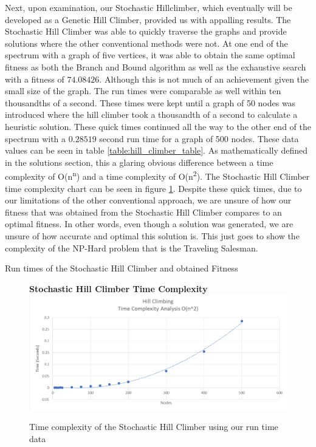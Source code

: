 \documentclass[sigplan,screen]{acmart}
\begin{document}
Next, upon examination, our Stochastic Hillclimber, which eventually will be
developed as a Genetic Hill Climber, provided us with appalling results. The
Stochastic Hill Climber was able to quickly traverse the graphs and provide
solutions where the other conventional methods were not. At one end of the
spectrum with a graph of five vertices, it was able to obtain the same optimal
fitness as both the Branch and Bound algorithm as well as the exhaustive search
with a fitness of $74.08426$. Although this is not much of an achievement given
the small size of the graph. The run times were comparable as well within ten
thousandths of a second. These times were kept until a graph of 50 nodes was
introduced where the hill climber took a thousandth of a second to calculate a
heuristic solution. These quick times continued all the way to the other end of
the spectrum with a $0.28519$ second run time for a graph of 500 nodes. These
data values can be seen in table \ref{table:hill_climber_table}. As
mathematically defined in the solutions section, this a glaring obvious
difference between a time complexity of O(n\textsuperscript{n}) and a time
complexity of O(n\textsuperscript{2}). The Stochastic Hill Climber time
complexity chart can be seen in figure \ref{fig:hill_climber}. Despite these
quick times, due to our limitations of the other conventional approach, we are
unsure of how our fitness that was obtained from the Stochastic Hill Climber
compares to an optimal fitness. In other words, even though a solution was
generated, we are unsure of how accurate and optimal this solution is. This just
goes to show the complexity of the NP-Hard problem that is the Traveling
Salesman.

\begin{table}[h]
    \setlength\tabcolsep{2pt}
    \centering
    
    \caption{Run times of the Stochastic Hill Climber and obtained Fitness}
    \label{table:hill_climber_table}
\end{table}


\begin{figure}[h]
    \centering
    \textbf{Stochastic Hill Climber Time Complexity}
    \includegraphics[width=\columnwidth]{assets/hill_climber.png}
    \caption{Time complexity of the Stochastic Hill Climber using our run time data}
    \label{fig:hill_climber}
\end{figure}
\end{document}
